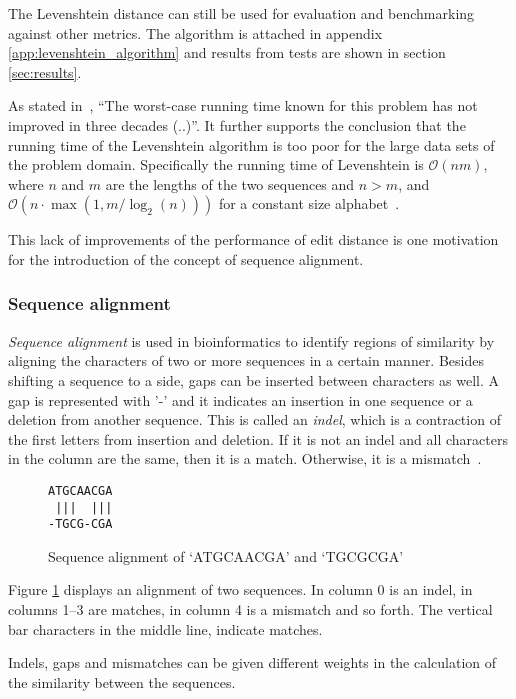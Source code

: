 The Levenshtein distance can still be used for evaluation and benchmarking
against other metrics. The algorithm is attached in appendix
\ref{app:levenshtein_algorithm} and results from tests are shown in section
\ref{sec:results}.

As stated in~\cite[pp.~1--2]{andoni}, ``The worst-case running time known for
this problem has not improved in three decades (..)''. It further supports the
conclusion that the running time of the Levenshtein algorithm is too poor for
the large data sets of the problem domain. Specifically the running time of
Levenshtein is $\mathcal{O}(nm)$, where $n$ and $m$ are the lengths of the two
sequences and $n>m$, and $\mathcal{O}(n \cdot \max{(1,m/\log_2(n))})$ for a
constant size alphabet~\cite{masek}.

This lack of improvements of the performance of edit distance is one motivation
for the introduction of the concept of sequence alignment.


\subsubsection{Sequence alignment}

\emph{Sequence alignment} is used in bioinformatics to identify regions of
similarity by aligning the characters of two or more sequences in a certain
manner. Besides shifting a sequence to a side, gaps can be inserted between
characters as well. A gap is represented with '-' and it indicates an insertion
in one sequence or a deletion from another sequence. This is called an
\emph{indel}, which is a contraction of the first letters from insertion and
deletion. If it is not an indel and all characters in the column are the same,
then it is a match. Otherwise, it is a mismatch~\cite[pp.~135--136]{dong}.

\begin{figure}[H]
  \centering
  \verb+ATGCAACGA+ \\
  \verb+ |||  |||+ \\
  \verb+-TGCG-CGA+
  \caption{Sequence alignment of `ATGCAACGA' and `TGCGCGA'}
  \label{fig:seq_alignment}
\end{figure}

Figure \ref{fig:seq_alignment} displays an alignment of two sequences. In
column 0 is an indel, in columns 1--3 are matches, in column 4 is a mismatch
and so forth. The vertical bar characters in the middle line, indicate matches.

Indels, gaps and mismatches can be given different weights in the calculation
of the similarity between the sequences.

